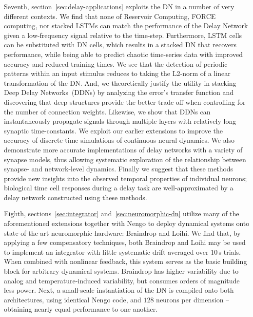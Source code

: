 Seventh, section~\ref{sec:delay-applications} exploits the DN in a number of very different contexts.
We find that none of Reservoir Computing, FORCE computing, nor stacked LSTMs can match the performance of the Delay Network given a low-frequency signal relative to the time-step.
Furthermore, LSTM cells can be substituted with DN cells, which results in a stacked DN that recovers performance, while being able to predict chaotic time-series data with improved accuracy and reduced training times.
We see that the detection of periodic patterns within an input stimulus reduces to taking the L2-norm of a linear transformation of the DN.
And, we theoretically justify the utility in stacking Deep Delay Networks~(DDNs) by analyzing the error's transfer function and discovering that deep structures provide the better trade-off when controlling for the number of connection weights.
Likewise, we show that DDNs can instantaneously propagate signals through multiple layers with relatively long synaptic time-constants.
We exploit our earlier extensions to improve the accuracy of discrete-time simulations of continuous neural dynamics.
We also demonstrate more accurate implementations of delay networks with a variety of synapse models, thus allowing systematic exploration of the relationship between synapse- and network-level dynamics.
Finally we suggest that these methods provide new insights into the observed temporal properties of individual neurons; biological time cell responses during a delay task are well-approximated by a delay network constructed using these methods.

Eighth, sections~\ref{sec:integrator} and~\ref{sec:neuromorphic-dn} utilize many of the aforementioned extensions together with Nengo to deploy dynamical systems onto state-of-the-art neuromorphic hardware: Braindrop and Loihi.
We find that, by applying a few compensatory techniques, both Braindrop and Loihi may be used to implement an integrator with little systematic drift averaged over $10$\,s trials.
When combined with nonlinear feedback, this system serves as the basic building block for arbitrary dynamical systems.
Braindrop has higher variability due to analog and temperature-induced variability, but consumes orders of magnitude less power.
Next, a small-scale instantiation of the DN is compiled onto both architectures, using identical Nengo code, and $128$ neurons per dimension -- obtaining nearly equal performance to one another.

